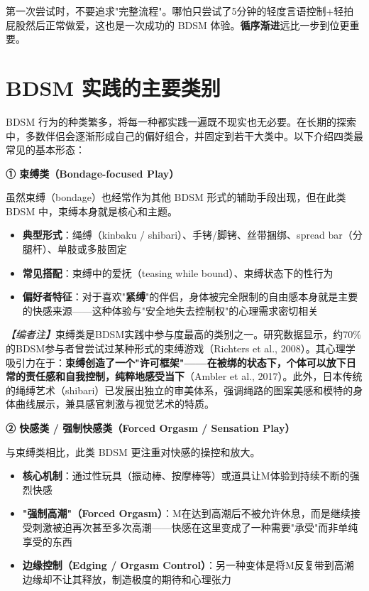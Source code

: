 \documentclass[12pt,UTF8]{ctexbook}
\begin{document}
\begin{tcolorbox}[colback=pink!5!white,colframe=red!50!black,title=贴心小叮咛]
第一次尝试时，不要追求"完整流程"。哪怕只尝试了5分钟的轻度言语控制+轻拍屁股然后正常做爱，这也是一次成功的 BDSM 体验。\textbf{循序渐进}远比一步到位更重要。
\end{tcolorbox}

\section{BDSM 实践的主要类别}

BDSM 行为的种类繁多，将每一种都实践一遍既不现实也无必要。在长期的探索中，多数伴侣会逐渐形成自己的偏好组合，并固定到若干大类中。以下介绍四类最常见的基本形态：

\noindent\textbf{① 束缚类（Bondage-focused Play）}

虽然束缚（bondage）也经常作为其他 BDSM 形式的辅助手段出现，但在此类 BDSM 中，束缚本身就是核心和主题。

\begin{itemize}
	\item \textbf{典型形式}：绳缚（kinbaku / shibari）、手铐/脚铐、丝带捆绑、spread bar（分腿杆）、单肢或多肢固定
	\item \textbf{常见搭配}：束缚中的爱抚（teasing while bound）、束缚状态下的性行为
	\item \textbf{偏好者特征}：对于喜欢"\textbf{紧缚}"的伴侣，身体被完全限制的自由感本身就是主要的快感来源——这种体验与"安全地失去控制权"的心理需求密切相关
\end{itemize}

\textit{【编者注】}束缚类是BDSM实践中参与度最高的类别之一。研究数据显示，约70\%的BDSM参与者曾尝试过某种形式的束缚游戏（Richters et al., 2008）。其心理学吸引力在于：\textbf{束缚创造了一个"许可框架"——在被绑的状态下，个体可以放下日常的责任感和自我控制，纯粹地感受当下}（Ambler et al., 2017）。此外，日本传统的绳缚艺术（shibari）已发展出独立的审美体系，强调绳路的图案美感和模特的身体曲线展示，兼具感官刺激与视觉艺术的特质。

\noindent\textbf{② 快感类 / 强制快感类（Forced Orgasm / Sensation Play）}

与束缚类相比，此类 BDSM 更注重对快感的操控和放大。

\begin{itemize}
	\item \textbf{核心机制}：通过性玩具（振动棒、按摩棒等）或道具让M体验到持续不断的强烈快感
	\item \textbf{"强制高潮"（Forced Orgasm）}：M在达到高潮后不被允许休息，而是继续接受刺激被迫再次甚至多次高潮——快感在这里变成了一种需要"承受"而非单纯享受的东西
	\item \textbf{边缘控制（Edging / Orgasm Control）}：另一种变体是将M反复带到高潮边缘却不让其释放，制造极度的期待和心理张力
\end{itemize}
\end{document}
